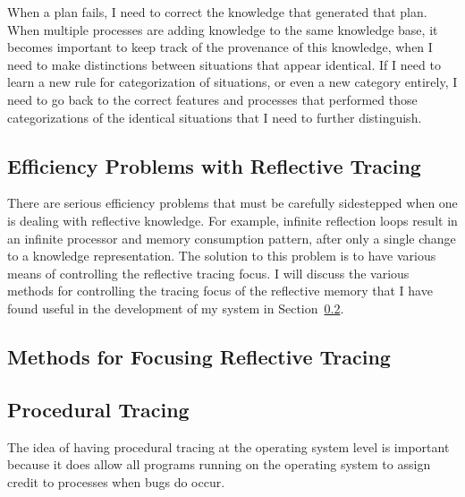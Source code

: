When a plan fails, I need to correct the knowledge that generated that
plan.  When multiple processes are adding knowledge to the same
knowledge base, it becomes important to keep track of the provenance of
this knowledge, when I need to make distinctions between situations
that appear identical.  If I need to learn a new rule for
categorization of situations, or even a new category entirely, I need
to go back to the correct features and processes that performed those
categorizations of the identical situations that I need to further
distinguish.

\subsection{Efficiency Problems with Reflective Tracing}
\label{sec:reflective_tracing}

There are serious efficiency problems that must be carefully
sidestepped when one is dealing with reflective knowledge.  For
example, infinite reflection loops result in an infinite processor and
memory consumption pattern, after only a single change to a knowledge
representation.  The solution to this problem is to have various means
of controlling the reflective tracing focus.  I will discuss the
various methods for controlling the tracing focus of the reflective
memory that I have found useful in the development of my system in
Section~\ref{sec:methods_for_focusing_reflective_tracing}.


\subsection{Methods for Focusing Reflective Tracing}
\label{sec:methods_for_focusing_reflective_tracing}


\subsection{Procedural Tracing}

The idea of having procedural tracing at the operating system level is
important because it does allow all programs running on the operating
system to assign credit to processes when bugs do occur.


